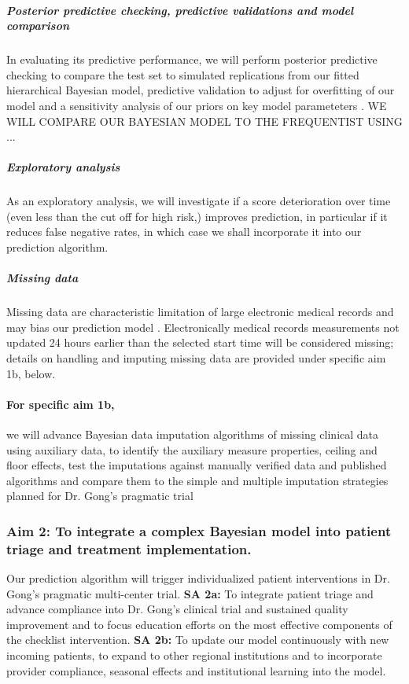 \documentclass[11pt,notitlepage]{article}
\begin{document}
\subparagraph*{Posterior predictive checking, predictive validations and model comparison}
In evaluating its predictive performance, we will perform posterior predictive checking to compare the test set to simulated replications from our fitted hierarchical Bayesian model, predictive validation to adjust for overfitting of our model and a sensitivity analysis of our priors on key model parameteters \cite{Gelman-Hill_2014,Gelman_predictive_2000}. WE WILL COMPARE OUR BAYESIAN MODEL TO THE FREQUENTIST USING ... 

\subparagraph{Exploratory analysis}
As an exploratory analysis, we will investigate if a score deterioration over time (even less than the cut off for high risk,) improves prediction, in particular if it reduces false negative rates, in which case we shall incorporate it into our prediction algorithm.

\subparagraph*{Missing data}
Missing data are characteristic limitation of large electronic medical records and may bias our prediction model \cite{Dean_19279318}. Electronically medical records measurements not updated 24 hours earlier than the selected start time will be considered missing; details on handling and imputing missing data are provided under specific aim 1b, below. 

\paragraph*{For specific aim 1b,}
we will advance Bayesian data imputation algorithms of missing clinical data using auxiliary data, to identify the auxiliary measure properties, ceiling and floor effects, test the imputations against manually verified data and published algorithms and compare them to the simple and multiple imputation strategies planned for Dr. Gong's pragmatic trial \cite{Huntington_16311133,Sloan_15027501}


\subsubsection*{Aim 2: To integrate a complex Bayesian model into patient triage and treatment implementation.}
Our prediction algorithm will trigger individualized patient interventions in Dr. Gong's pragmatic multi-center trial. 
\newline \textbf{SA 2a:} To integrate patient triage and advance compliance into Dr. Gong's clinical trial and sustained quality improvement and to focus education efforts on the most effective components of the checklist intervention.
\newline \textbf{SA 2b:} To update our model continuously with new incoming patients, to expand to other regional institutions and to incorporate provider compliance, seasonal effects and institutional learning into the model.
\end{document}
